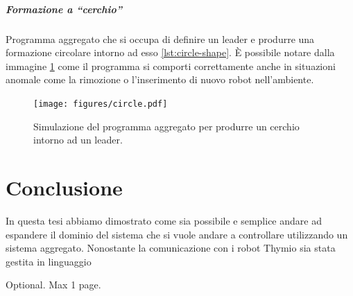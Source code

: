 \documentclass[12pt,a4paper,openright,twoside]{book}
\begin{document}
\paragraph{Formazione a ``cerchio''}

Programma aggregato che si occupa di definire un leader e produrre una formazione circolare intorno ad esso \cref{lst:circle-shape}. È possibile notare dalla immagine \cref{fig:circle-formation} come il programma si comporti correttamente anche in situazioni anomale come la rimozione o l'inserimento di nuovo robot nell'ambiente.



\begin{figure}
    \centering
    \texttt{[image: figures/circle.pdf]}
    \caption{Simulazione del programma aggregato per produrre un cerchio intorno ad un leader.}
    \label{fig:circle-formation}
\end{figure}

\chapter{Conclusione}
\label{chap:conclusione}

In questa tesi abbiamo dimostrato come sia possibile e semplice andare ad espandere il dominio del sistema che si vuole andare a controllare utilizzando un sistema aggregato. Nonostante la comunicazione con i robot Thymio sia stata gestita in linguaggio 


\backmatter




\begin{acknowledgements} %
Optional. Max 1 page.
\end{acknowledgements}
\end{document}
